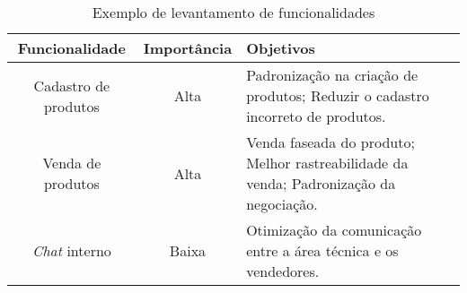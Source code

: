       \begin{table}[h!]
        \centering
        \begin{tabular}{|c|c|p{8cm}|}
          \hline
          \textbf{Funcionalidade} &
          \textbf{Importância}  &
          \textbf{Objetivos} \\ \hline
          Cadastro de produtos &
          Alta &
          Padronização na criação de produtos; \newline
          Reduzir o cadastro incorreto de produtos.
          \\ \hline
          Venda de produtos &
          Alta &
          Venda faseada do produto; \newline
          Melhor rastreabilidade da venda; \newline
          Padronização da negociação.
          \\ \hline
          \textit{Chat} interno &
          Baixa &
          Otimização da comunicação entre a área técnica e os vendedores.
          \\ \hline
        \end{tabular}
        \caption{Exemplo de levantamento de funcionalidades}
        \label{Tabela:2}
      \end{table}

